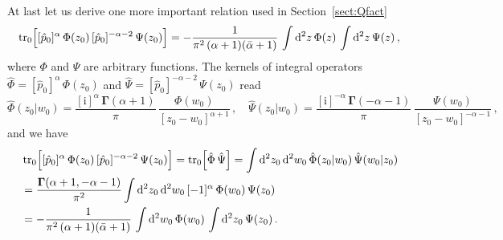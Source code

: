 \documentclass[a4paper,11pt]{article}
\renewcommand{\imath}{\mathrm{i}}
\newcommand{\tr}{\mathop{\rm tr}\nolimits}
\numberwithin{equation}{section}
\begin{document}
At last let us derive one more important relation used in Section~\ref{sect:Qfact}
\begin{equation} \label{trppApp}
	\tr_0\Bigl[[\hat{p}_0]^\alpha\,\Phi(z_0)\,[\hat{p}_0]^{-\alpha-2}\,\Psi(z_0)\Bigr] =
	-\frac{1}{\pi^2\,(\alpha+1)(\bar{\alpha}+1)} \,
	\int \mathrm{d}^2z \, \Phi(z) \, \int \mathrm{d}^2z \, \Psi(z) \,,
\end{equation}
where $\Phi$ and $\Psi$ are arbitrary functions.
The kernels of integral operators $\hat{\Phi}=[\hat{p}_0]^\alpha\,\Phi(z_0)$ and $\hat{\Psi}=[\hat{p}_0]^{-\alpha-2}\,\Psi(z_0)$ read
\begin{equation} \nonumber
	\hat{\Phi}(z_0|w_0) =
	\frac{[\imath]^\alpha\,\mathbf{\Gamma}(\alpha+1)}{\pi}\,\frac{\Phi(w_0)}{[z_0-w_0]^{\alpha+1}} \,, \quad
	\hat{\Psi}(z_0|w_0) =
	\frac{[\imath]^{-\alpha}\,\mathbf{\Gamma}(-\alpha-1)}{\pi}\,\frac{\Psi(w_0)}{[z_0-w_0]^{-\alpha-1}} \,,
\end{equation}
and we have
\begin{align}
	& \nonumber
	\tr_0\Bigl[[\hat{p}_0]^\alpha\,\Phi(z_0)\,[\hat{p}_0]^{-\alpha-2}\,\Psi(z_0)\Bigr] =
	\tr_0\Bigl[\hat{\Phi}\,\hat{\Psi}\Bigr] =
	\int \mathrm{d}^2z_0\,\mathrm{d}^2w_0 \,
	\hat{\Phi}(z_0|w_0)\,\hat{\Psi}(w_0|z_0) \\
	& \nonumber
	= \frac{\mathbf{\Gamma}(\alpha+1,-\alpha-1)}{\pi^2}
	\int \mathrm{d}^2z_0\,\mathrm{d}^2w_0 \,
	[-1]^{\alpha}\,\Phi(w_0)\,\Psi(z_0) \\
	& \nonumber
	= -\frac{1}{\pi^2\,(\alpha+1)(\bar{\alpha}+1)} \,
	\int \mathrm{d}^2w_0 \, \Phi(w_0) \, \int \mathrm{d}^2z_0 \, \Psi(z_0) \,.
\end{align}
\end{document}
